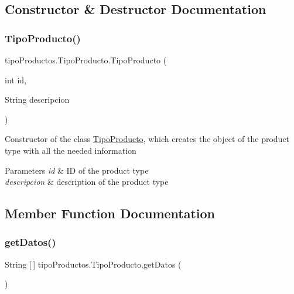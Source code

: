 \subsection{Constructor \& Destructor Documentation}
\mbox{\label{classtipo_productos_1_1_tipo_producto_abc3130af94301f568e71a09729690060}} 
\subsubsection{\texorpdfstring{Tipo\+Producto()}{TipoProducto()}}
{\footnotesize\ttfamily tipo\+Productos.\+Tipo\+Producto.\+Tipo\+Producto (\begin{DoxyParamCaption}\item[{int}]{id,  }\item[{String}]{descripcion }\end{DoxyParamCaption})}

Constructor of the class \mbox{\hyperlink{classtipo_productos_1_1_tipo_producto}{Tipo\+Producto}}, which creates the object of the product type with all the needed information 
\begin{DoxyParams}{Parameters}
{\em id} & ID of the product type \\
\hline
{\em descripcion} & description of the product type \\
\hline
\end{DoxyParams}


\subsection{Member Function Documentation}
\mbox{\label{classtipo_productos_1_1_tipo_producto_a85837c84193d02f0ed6b43809c09e13e}} 
\subsubsection{\texorpdfstring{get\+Datos()}{getDatos()}}
{\footnotesize\ttfamily String \mbox{[}$\,$\mbox{]} tipo\+Productos.\+Tipo\+Producto.\+get\+Datos (\begin{DoxyParamCaption}{ }\end{DoxyParamCaption})}

